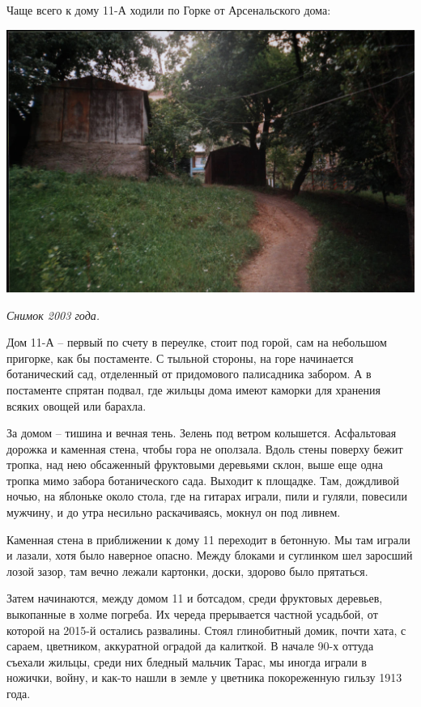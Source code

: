 Чаще всего к дому 11-А ходили по Горке от Арсенальского дома:

\begin{center}
\includegraphics[width=\linewidth]{chast-vosp/zver/gorka.jpg}

\textit{Снимок 2003 года.}
\end{center}

Дом 11-А – первый по счету в переулке, стоит под горой, сам на небольшом пригорке, как бы постаменте. С тыльной стороны, на горе начинается ботанический сад, отделенный от придомового палисадника забором. А в постаменте спрятан подвал, где жильцы дома имеют каморки для хранения всяких овощей или барахла. 


За домом – тишина и вечная тень. Зелень под ветром колышется. Асфальтовая дорожка и каменная стена, чтобы гора не оползала. Вдоль стены поверху бежит тропка, над нею обсаженный фруктовыми деревьями склон, выше еще одна тропка мимо забора ботанического сада. Выходит к площадке. Там, дождливой ночью, на яблоньке около стола, где на гитарах играли, пили и гуляли, повесили мужчину, и до утра несильно раскачиваясь, мокнул он под ливнем.

Каменная стена в приближении к дому 11 переходит в бетонную. Мы там играли и лазали, хотя было наверное опасно. Между блоками и суглинком шел заросший лозой зазор, там вечно лежали картонки, доски, здорово было прятаться.

Затем начинаются, между домом 11 и ботсадом, среди фруктовых деревьев, выкопанные в холме погреба. Их череда прерывается частной усадьбой, от которой на 2015-й остались развалины. Стоял глинобитный домик, почти хата, с сараем, цветником, аккуратной оградой да калиткой. В начале 90-х оттуда съехали жильцы, среди них бледный мальчик Тарас, мы иногда играли в ножички, войну, и как-то нашли в земле у цветника покореженную гильзу 1913 года.

